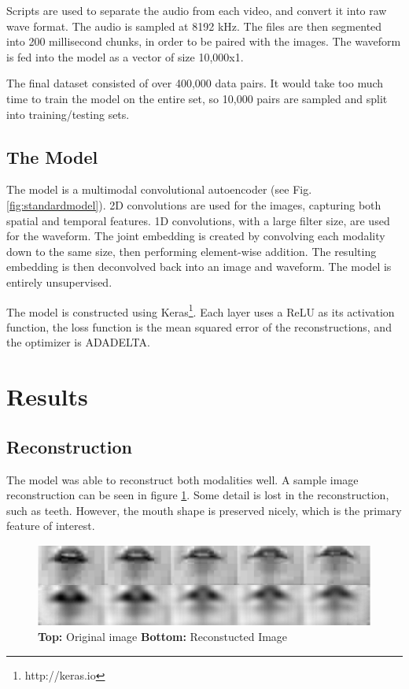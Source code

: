 \documentclass[conference]{IEEEtran}
\begin{document}
Scripts are used to separate the audio from each video, and convert it into raw wave format. The audio is sampled at 8192 kHz. The files are then segmented into 200 millisecond chunks, in order to be paired with the images. The waveform is fed into the model as a vector of size 10,000x1.

The final dataset consisted of over 400,000 data pairs. It would take too much time to train the model on the entire set, so 10,000 pairs are sampled and split into training/testing sets.

\subsection{The Model}
The model is a multimodal convolutional autoencoder (see Fig. \ref{fig:standardmodel}). 2D convolutions are used for the images, capturing both spatial and temporal features. 1D convolutions, with a large filter size, are used for the waveform. The joint embedding is created by convolving each modality down to the same size, then performing element-wise addition. The resulting embedding is then deconvolved back into an image and waveform. The model is entirely unsupervised.

The model is constructed using Keras\footnote{http://keras.io}. Each layer uses a ReLU as its activation function, the loss function is the mean squared error of the reconstructions, and the optimizer is ADADELTA.\cite{Nair2010}\cite{Zeiler2012}

\section{Results}
\subsection{Reconstruction}
The model was able to reconstruct both modalities well. A sample image reconstruction can be seen in figure \ref{fig:imgrecon}. Some detail is lost in the reconstruction, such as teeth. However, the mouth shape is preserved nicely, which is the primary feature of interest.

\begin{figure}[h]
\centering
\includegraphics[scale=0.5]{imgrecon}
\caption{\textbf{Top:} Original image \textbf{Bottom:} Reconstucted Image}
\label{fig:imgrecon}
\end{figure}
\end{document}

